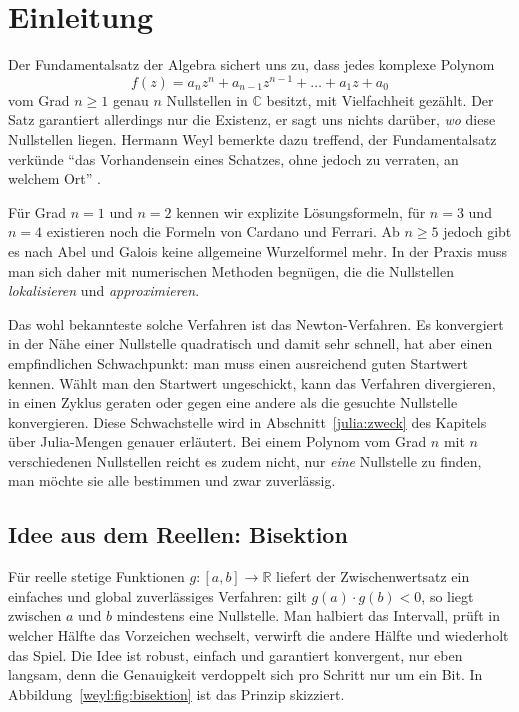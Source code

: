 %
%
%
%
\section{Einleitung%
\label{weyl:section:einleitung}}
Der Fundamentalsatz der Algebra sichert uns zu, dass jedes komplexe Polynom
\[
f(z)
=
a_n z^n + a_{n-1} z^{n-1} + \dots + a_1 z + a_0
\]
vom Grad $n \geq 1$ genau $n$ Nullstellen in $\mathbb{C}$ besitzt, mit Vielfachheit
gezählt.
Der Satz garantiert allerdings nur die Existenz, er sagt uns nichts darüber, \emph{wo}
diese Nullstellen liegen.
Hermann Weyl bemerkte dazu treffend, der Fundamentalsatz verkünde
"`das Vorhandensein eines Schatzes, ohne jedoch zu verraten, an welchem Ort"'
\cite{weyl:eisermann}.

Für Grad $n = 1$ und $n = 2$ kennen wir explizite Lösungsformeln, für $n = 3$ und
$n = 4$ existieren noch die Formeln von Cardano und Ferrari.
%
%
Ab $n \geq 5$ jedoch gibt es nach Abel und Galois keine allgemeine Wurzelformel mehr.
%
%
In der Praxis muss man sich daher mit numerischen Methoden begnügen, die die Nullstellen
\emph{lokalisieren} und \emph{approximieren}.

Das wohl bekannteste solche Verfahren ist das Newton-Verfahren.
%
Es konvergiert in der Nähe einer Nullstelle quadratisch und damit sehr schnell, hat aber
%
einen empfindlichen Schwachpunkt: man muss einen ausreichend guten Startwert kennen.
%
Wählt man den Startwert ungeschickt, kann das Verfahren divergieren, in einen Zyklus
geraten oder gegen eine andere als die gesuchte Nullstelle konvergieren.
Diese Schwachstelle wird in Abschnitt~\ref{julia:zweck} des Kapitels über Julia-Mengen
%
genauer erläutert.
Bei einem Polynom vom Grad $n$ mit $n$ verschiedenen Nullstellen reicht es zudem nicht,
nur \emph{eine} Nullstelle zu finden, man möchte sie alle bestimmen und zwar
zuverlässig.

\subsection{Idee aus dem Reellen: Bisektion%
\label{weyl:subsection:bisektion}}
%
Für reelle stetige Funktionen $g\colon [a,b] \to \mathbb{R}$ liefert der Zwischenwertsatz
ein einfaches und global zuverlässiges Verfahren: gilt $g(a) \cdot g(b) < 0$, so liegt
zwischen $a$ und $b$ mindestens eine Nullstelle.
Man halbiert das Intervall, prüft in welcher Hälfte das Vorzeichen wechselt, verwirft
die andere Hälfte und wiederholt das Spiel.
Die Idee ist robust, einfach und garantiert konvergent, nur eben langsam, denn die
Genauigkeit verdoppelt sich pro Schritt nur um ein Bit.
In Abbildung~\ref{weyl:fig:bisektion} ist das Prinzip skizziert.

